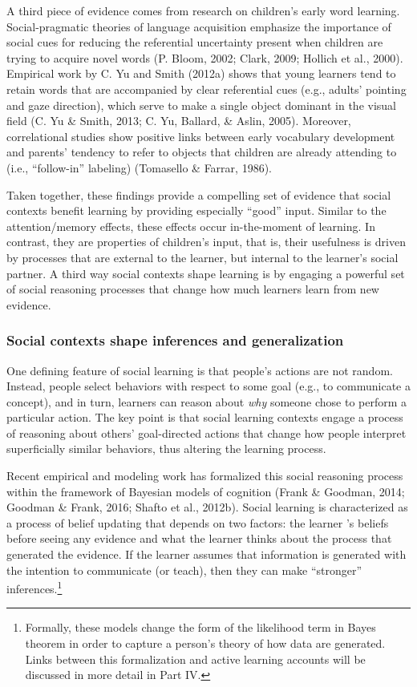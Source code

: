 \documentclass[english,floatsintext,man]{apa6}
\theoremstyle{definition}
\theoremstyle{definition}
\theoremstyle{definition}
\theoremstyle{remark}
\begin{document}
A third piece of evidence comes from research on children's early word
learning. Social-pragmatic theories of language acquisition emphasize
the importance of social cues for reducing the referential uncertainty
present when children are trying to acquire novel words (P. Bloom, 2002;
Clark, 2009; Hollich et al., 2000). Empirical work by C. Yu and Smith
(2012a) shows that young learners tend to retain words that are
accompanied by clear referential cues (e.g., adults' pointing and gaze
direction), which serve to make a single object dominant in the visual
field (C. Yu \& Smith, 2013; C. Yu, Ballard, \& Aslin, 2005). Moreover,
correlational studies show positive links between early vocabulary
development and parents' tendency to refer to objects that children are
already attending to (i.e., \enquote{follow-in} labeling) (Tomasello \&
Farrar, 1986).

Taken together, these findings provide a compelling set of evidence that
social contexts benefit learning by providing especially \enquote{good}
input. Similar to the attention/memory effects, these effects occur
in-the-moment of learning. In contrast, they are properties of
children's input, that is, their usefulness is driven by processes that
are external to the learner, but internal to the learner's social
partner. A third way social contexts shape learning is by engaging a
powerful set of social reasoning processes that change how much learners
learn from new evidence.

\subsubsection{Social contexts shape inferences and
generalization}\label{social-contexts-shape-inferences-and-generalization}

One defining feature of social learning is that people's actions are not
random. Instead, people select behaviors with respect to some goal
(e.g., to communicate a concept), and in turn, learners can reason about
\emph{why} someone chose to perform a particular action. The key point
is that social learning contexts engage a process of reasoning about
others' goal-directed actions that change how people interpret
superficially similar behaviors, thus altering the learning process.

Recent empirical and modeling work has formalized this social reasoning
process within the framework of Bayesian models of cognition (Frank \&
Goodman, 2014; Goodman \& Frank, 2016; Shafto et al., 2012b). Social
learning is characterized as a process of belief updating that depends
on two factors: the learner 's beliefs before seeing any evidence and
what the learner thinks about the process that generated the evidence.
If the learner assumes that information is generated with the intention
to communicate (or teach), then they can make \enquote{stronger}
inferences.\footnote{Formally, these models change the form of the
  likelihood term in Bayes theorem in order to capture a person's theory
  of how data are generated. Links between this formalization and active
  learning accounts will be discussed in more detail in Part IV.}
\end{document}
